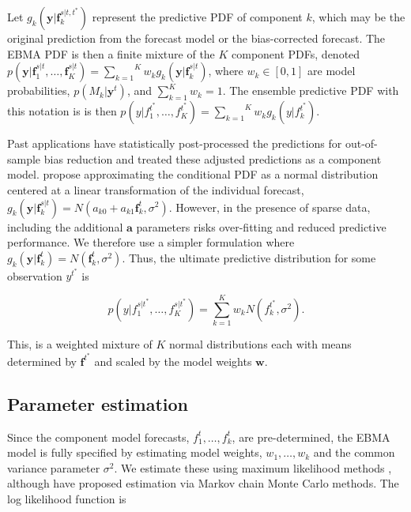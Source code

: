 \documentclass[12pt,fullpage,endnotes]{article}
\begin{document}
Let $g_k(\mathbf{y}|\mathbf{f}_k^{s|t, t^\ast})$ represent the
predictive PDF of component $k$, which may be the original prediction
from the forecast model or the bias-corrected forecast.  The EBMA PDF
is then a finite mixture of the $K$ component PDFs, denoted
$p(\mathbf{y}|\mathbf{f}_1^{s|t}, \ldots,
\mathbf{f}_K^{s|t})=\overset{K}{\underset{k=1}{\sum}} w_k
g_k(\mathbf{y}|\mathbf{f}_k^{s|t})$, where $w_k \in [0,1]$ are model
probabilities, $p(M_k|\mathbf{y}^t)$, and $\sum_{k=1}^Kw_k=1$. The
ensemble predictive PDF with this notation is is then
$p(y|f_{1}^{t^\ast}, \ldots,
f_{K}^{t^\ast})=\overset{K}{\underset{k=1}{\sum}} w_k
g_k(y|f_{k}^{t^*})$.

Past applications have statistically post-processed the predictions for
out-of-sample bias reduction and treated these adjusted predictions as a
component model. \citet{Raftery:2005} propose approximating the
conditional PDF as a normal distribution centered at a linear
transformation of the individual forecast,
$g_k(\mathbf{y}|\mathbf{f}_k^{s|t}) = N(a_{k0} +
a_{k1}\mathbf{f}_k^{t}, \sigma^2)$. However, in the presence of sparse
data, including the additional $\mathbf{a}$ parameters risks
over-fitting and reduced predictive performance.  We therefore use a
simpler formulation where $g_k(\mathbf{y}|\mathbf{f}_k^{t}) =
N(\mathbf{f}_k^{t}, \sigma^2)$.  Thus, the ultimate predictive
distribution for some observation $y^{t^\ast}$ is 

\begin{equation}
\label{pdf}p(y|f_1^{s|t^\ast},
\ldots, f_K^{s|t^\ast}) = \overset{K}{\underset{k=1}{\sum}} w_k
N(f_k^{t^\ast}, \sigma^2).
\end{equation}

\noindent This, is a weighted mixture of $K$ normal distributions each with 
means  determined by $\mathbf{f}^{t^\ast}$ and scaled by the
model weights $\mathbf{w}$.

\subsection{Parameter estimation}

Since the component model forecasts, $f^t_1, \ldots, f^t_k$, are
pre-determined, the EBMA model is fully specified by estimating model
weights, $w_1, \ldots, w_k$ and the common variance parameter
$\sigma^2$.  We estimate these using maximum likelihood methods
\citep{Raftery:2005}, although \citet{Vrugt:2008} have proposed
estimation via Markov chain Monte Carlo methods.  The log likelihood
function is
\end{document}

